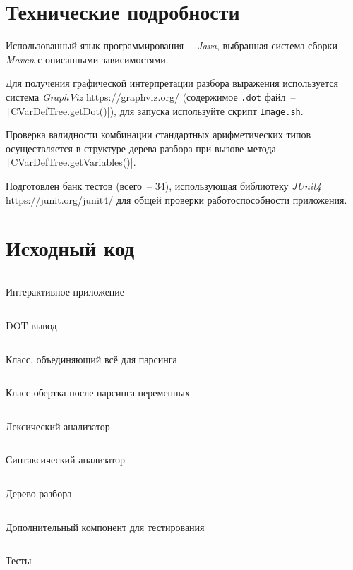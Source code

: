 \documentclass[12pt, a4paper, oneside, final]{article}
\newenvironment{code}{\captionsetup{type=listing}}{}
\begin{document}
	\section{Технические подробности}
	Использованный язык программирования~-- \textit{Java}, выбранная система сборки~-- \textit{Maven} с описанными зависимостями.
	
	Для получения графической интерпретации разбора выражения используется система \textit{GraphViz} \url{https://graphviz.org/} (содержимое \texttt{.dot} файл~-- \texttt|CVarDefTree.getDot()|), для запуска используйте скрипт \texttt{Image.sh}.
	
	Проверка валидности комбинации стандартных арифметических типов осуществляется в структуре дерева разбора при вызове метода \texttt|CVarDefTree.getVariables()|.
	
	Подготовлен банк тестов (всего~-- 34), использующая библиотеку \textit{JUnit4} \url{https://junit.org/junit4/} для общей проверки работоспособности приложения.
	\section{Исходный код}
	\begin{code}
		\inputminted{java}{./src/main/java/bakturin/lab2/Main.java}
		\caption{Интерактивное приложение}
	\end{code}
	\begin{code}
		\inputminted{java}{./src/main/java/bakturin/lab2/Graphics.java}
		\caption{DOT-вывод}
	\end{code}
	\begin{code}
		\inputminted{java}{./src/main/java/bakturin/lab2/cvardef/CVarDef.java}
		\caption{Класс, объединяющий всё для парсинга}
	\end{code}
	\begin{code}
		\inputminted{java}{./src/main/java/bakturin/lab2/cvardef/CVarDefVariable.java}
		\caption{Класс-обертка после парсинга переменных}
	\end{code}
	\begin{code}
		\inputminted{java}{./src/main/java/bakturin/lab2/cvardef/assets/CVarDefLexer.java}
		\caption{Лексический анализатор}
	\end{code}
	\begin{code}
		\inputminted{java}{./src/main/java/bakturin/lab2/cvardef/assets/CVarDefParser.java}
		\caption{Синтаксический анализатор}
	\end{code}
	\begin{code}
		\inputminted{java}{./src/main/java/bakturin/lab2/cvardef/assets/CVarDefTree.java}
		\caption{Дерево разбора}
	\end{code}
	\begin{code}
		\inputminted{java}{./src/test/java/CVarDefTester.java}
		\caption{Дополнительный компонент для тестирования}
	\end{code}
	\begin{code}
		\inputminted{java}{./src/test/java/CVarDefTests.java}
		\caption{Тесты}
	\end{code}
\end{document}
